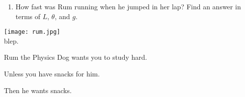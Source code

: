 \documentclass[12pt]{article}
\begin{document}
\begin{enumerate}
\begin{enumerate}
\item How fast was Rum running when he jumped in her lap? Find an answer in terms of $L$, $\theta$, and $g$.



\end{enumerate}

\newpage

\begin{minipage}{0.5\textwidth}
\begin{center}
\texttt{[image: rum.jpg]}\\
\scriptsize blep.
\end{center}
\end{minipage}
\begin{minipage}{0.5\textwidth}
\begin{center}
Rum the Physics Dog wants you to study hard. 

\bigskip
 Unless you have snacks for him. 
\bigskip

 Then he wants snacks.
\end{center}
\end{minipage}
\newpage


\newpage










\end{enumerate}
\end{document}
